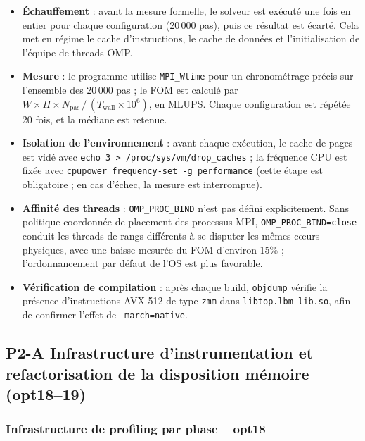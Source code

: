 \documentclass[a4paper,11pt,oneside]{report}
\begin{document}
\begin{itemize}
  \item \textbf{Échauffement} : avant la mesure formelle, le solveur est exécuté une fois en entier pour chaque configuration (20\,000 pas), puis ce résultat est écarté. Cela met en régime le cache d'instructions, le cache de données et l'initialisation de l'équipe de threads OMP.

  \item \textbf{Mesure} : le programme utilise \texttt{MPI\_Wtime} pour un chronométrage précis sur l'ensemble des 20\,000 pas ; le FOM est calculé par $W \times H \times N_\text{pas} \,/\, (T_\text{wall}
        \times 10^6)$, en MLUPS. Chaque configuration est répétée 20 fois, et la médiane est retenue.

  \item \textbf{Isolation de l'environnement} : avant chaque exécution, le cache de pages est vidé avec
        \texttt{echo 3 > /proc/sys/vm/drop\_caches} ;
        la fréquence CPU est fixée avec \texttt{cpupower frequency-set -g performance}
        (cette étape est obligatoire ; en cas d'échec, la mesure est interrompue).

  \item \textbf{Affinité des threads} : \texttt{OMP\_PROC\_BIND} n'est pas défini explicitement.
        Sans politique coordonnée de placement des processus MPI, \texttt{OMP\_PROC\_BIND=close}
        conduit les threads de rangs différents à se disputer les mêmes cœurs physiques, avec une baisse mesurée du FOM d'environ 15\% ;
        l'ordonnancement par défaut de l'OS est plus favorable.

  \item \textbf{Vérification de compilation} : après chaque build, \texttt{objdump} vérifie la présence
        d'instructions AVX-512 de type \texttt{zmm} dans \texttt{libtop.lbm-lib.so},
        afin de confirmer l'effet de \texttt{-march=native}.
\end{itemize}

\subsection{P2-A \quad Infrastructure d'instrumentation et refactorisation de la disposition mémoire (opt18–19)}

\subsubsection{Infrastructure de profiling par phase -- opt18}
\end{document}
